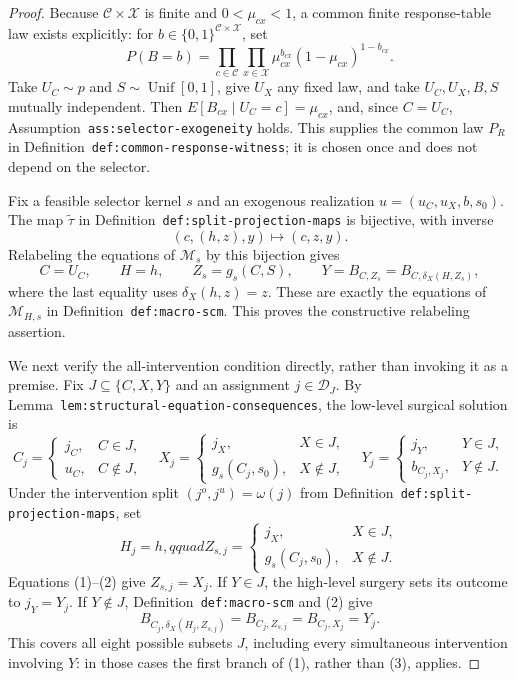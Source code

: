 \documentclass{article}
\begin{document}
\begin{proof}
Because \(\mathcal C\times\mathcal X\) is finite and \(0<\mu_{cx}<1\), a common finite response-table law exists explicitly: for \(b\in\{0,1\}^{\mathcal C\times\mathcal X}\), set
\[
P(B=b)=\prod_{c\in\mathcal C}\prod_{x\in\mathcal X}
\mu_{cx}^{b_{cx}}(1-\mu_{cx})^{1-b_{cx}}.
\]
Take \(U_C\sim p\) and \(S\sim\operatorname{Unif}[0,1]\), give \(U_X\) any fixed law, and take \(U_C,U_X,B,S\) mutually independent.  Then \(E[B_{cx}\mid U_C=c]=\mu_{cx}\), and, since \(C=U_C\), Assumption~\texttt{ass:selector-exogeneity} holds.  This supplies the common law \(P_R\) in Definition~\texttt{def:common-response-witness}; it is chosen once and does not depend on the selector.

Fix a feasible selector kernel \(s\) and an exogenous realization \(u=(u_C,u_X,b,s_0)\).  The map \(\widetilde\tau\) in Definition~\texttt{def:split-projection-maps} is bijective, with inverse
\[
(c,(h,z),y)\longmapsto(c,z,y).
\]
Relabeling the equations of \(\mathcal M_s\) by this bijection gives
\[
C=U_C,\qquad H=h,\qquad Z_s=g_s(C,S),
\qquad Y=B_{C,Z_s}=B_{C,\delta_X(H,Z_s)},
\]
where the last equality uses \(\delta_X(h,z)=z\).  These are exactly the equations of \(\mathcal M_{H,s}\) in Definition~\texttt{def:macro-scm}.  This proves the constructive relabeling assertion.

We next verify the all-intervention condition directly, rather than invoking it as a premise.  Fix \(J\subseteq\{C,X,Y\}\) and an assignment \(j\in\mathcal D_J\).  By Lemma~\texttt{lem:structural-equation-consequences}, the low-level surgical solution is
\[
C_j=\begin{cases}j_C,&C\in J,\\u_C,&C\notin J,\end{cases}
\quad
X_j=\begin{cases}j_X,&X\in J,\\g_s(C_j,s_0),&X\notin J,\end{cases}
\quad
Y_j=\begin{cases}j_Y,&Y\in J,\\b_{C_j,X_j},&Y\notin J.\end{cases}
\tag{1}
\]
Under the intervention split \((j^o,j^u)=\omega(j)\) from Definition~\texttt{def:split-projection-maps}, set
\[
H_j=h,qquad
Z_{s,j}=\begin{cases}j_X,&X\in J,\\g_s(C_j,s_0),&X\notin J.\end{cases}
\tag{2}
\]
Equations (1)--(2) give \(Z_{s,j}=X_j\).  If \(Y\in J\), the high-level surgery sets its outcome to \(j_Y=Y_j\).  If \(Y\notin J\), Definition~\texttt{def:macro-scm} and (2) give
\[
B_{C_j,\delta_X(H_j,Z_{s,j})}
=B_{C_j,Z_{s,j}}
=B_{C_j,X_j}
=Y_j.
\tag{3}
\]
This covers all eight possible subsets \(J\), including every simultaneous intervention involving \(Y\): in those cases the first branch of (1), rather than (3), applies.


\end{proof}
\end{document}
